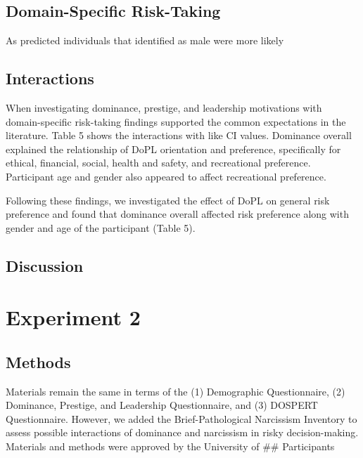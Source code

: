 \documentclass[
  donotrepeattitle,doc, 12pt, a4paper,floatsintext]{apa7}
\begin{document}
\hypertarget{domain-specific-risk-taking}{%
\subsection{Domain-Specific Risk-Taking}\label{domain-specific-risk-taking}}

As predicted individuals that identified as male were more likely

\hypertarget{interactions}{%
\subsection{Interactions}\label{interactions}}

When investigating dominance, prestige, and leadership motivations with domain-specific risk-taking findings supported the common expectations in the literature. Table 5 shows the interactions with like CI values. Dominance overall explained the relationship of DoPL orientation and preference, specifically for ethical, financial, social, health and safety, and recreational preference. Participant age and gender also appeared to affect recreational preference.

Following these findings, we investigated the effect of DoPL on general risk preference and found that dominance overall affected risk preference along with gender and age of the participant (Table 5).

\hypertarget{discussion}{%
\subsection{Discussion}\label{discussion}}

\hypertarget{experiment-2}{%
\section{Experiment 2}\label{experiment-2}}

\hypertarget{methods}{%
\subsection{Methods}\label{methods}}

Materials remain the same in terms of the (1) Demographic Questionnaire, (2) Dominance, Prestige, and Leadership Questionnaire, and (3) DOSPERT Questionnaire. However, we added the Brief-Pathological Narcissism Inventory to assess possible interactions of dominance and narcissism in risky decision-making. Materials and methods were approved by the University of
\#\# Participants
\end{document}

